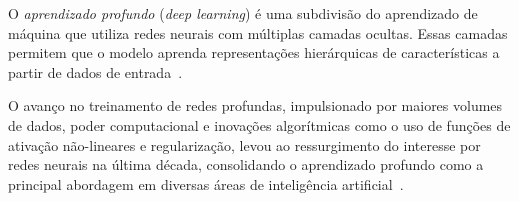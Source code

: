 \documentclass[12pt]{article}
\begin{document}
O \textit{aprendizado profundo} (\textit{deep learning}) é uma subdivisão do aprendizado de máquina que utiliza redes neurais com múltiplas camadas ocultas. Essas camadas permitem que o modelo aprenda representações hierárquicas de características a partir de dados de entrada~\cite{goodfellow2016}.

O avanço no treinamento de redes profundas, impulsionado por maiores volumes de dados, poder computacional e inovações algorítmicas como o uso de funções de ativação não-lineares e regularização, levou ao ressurgimento do interesse por redes neurais na última década, consolidando o aprendizado profundo como a principal abordagem em diversas áreas de inteligência artificial~\cite{goodfellow2016}.
\end{document}
